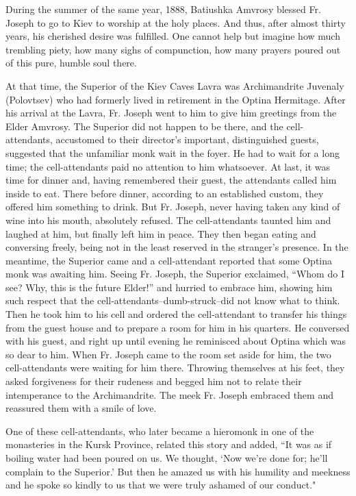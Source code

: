 During the summer of the same year, 1888, Batiushka Amvrosy blessed Fr. Joseph to go to Kiev to worship at the holy places. And thus, after almost thirty years, his cherished desire was fulfilled. One cannot help but imagine how much trembling piety, how many sighs of compunction, how many prayers poured out of this pure, humble soul there.

At that time, the Superior of the Kiev Caves Lavra was Archimandrite Juvenaly (Polovtsev) who had formerly lived in retirement in the Optina Hermitage. After his arrival at the Lavra, Fr. Joseph went to him to give him greetings from the Elder Amvrosy. The Superior did not happen to be there, and the cell-attendants, accustomed to their director's important, distinguished guests, suggested that the unfamiliar monk wait in the foyer. He had to wait for a long time; the cell-attendants paid no attention to him whatsoever. At last, it was time for dinner and, having remembered their guest, the attendants called him inside to eat. There before dinner, according to an established custom, they offered him something to drink. But Fr. Joseph, never having taken any kind of wine into his mouth, absolutely refused. The cell-attendants taunted him and laughed at him, but finally left him in peace. They then began eating and conversing freely, being not in the least reserved in the stranger's presence. In the meantime, the Superior came and a cell-attendant reported that some Optina monk was awaiting him. Seeing Fr. Joseph, the Superior exclaimed, “Whom do I see? Why, this is the future Elder!” and hurried to embrace him, showing him such respect that the cell-attendants--dumb-struck--did not know what to think. Then he took him to his cell and ordered the cell-attendant to transfer his things from the guest house and to prepare a room for him in his quarters. He conversed with his guest, and right up until evening he reminisced about Optina which was so dear to him. When Fr. Joseph came to the room set aside for him, the two cell-attendants were waiting for him there. Throwing themselves at his feet, they asked forgiveness for their rudeness and begged him not to relate their intemperance to the Archimandrite. The meek Fr. Joseph embraced them and reassured them with a smile of love.

One of these cell-attendants, who later became a hieromonk in one of the monasteries in the Kursk Province, related this story and added, “It was as if boiling water had been poured on us. We thought, ‘Now we're done for; he'll complain to the Superior.' But then he amazed us with his humility and meekness and he spoke so kindly to us that we were truly ashamed of our conduct."

